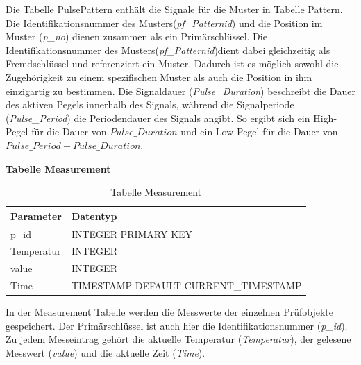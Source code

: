 Die Tabelle PulsePattern enthält die Signale für die Muster in Tabelle Pattern. Die Identifikationsnummer des Musters(\textit{pf\_Patternid}) und die Position im Muster (\textit{p\_no}) dienen zusammen als ein Primärschlüssel. Die Identifikationsnummer des Musters(\textit{pf\_Patternid})dient dabei gleichzeitig als Fremdschlüssel und referenziert ein Muster. Dadurch ist es möglich sowohl die Zugehörigkeit zu einem spezifischen Muster als auch die Position in ihm einzigartig zu bestimmen. Die Signaldauer (\textit{Pulse\_Duration}) beschreibt die Dauer des aktiven Pegels innerhalb des Signals, während die Signalperiode (\textit{Pulse\_Period}) die Periodendauer des Signals angibt. So ergibt sich ein High-Pegel für die Dauer von $Pulse\_Duration$ und ein Low-Pegel für die Dauer von $Pulse\_Period - Pulse\_Duration$.\\

\newpage

\textbf{Tabelle Measurement}\\

\begin{table}[H]
\begin{center}
\begin{tabular}{|l|l|}\hline
Parameter & Datentyp \\ \hline
p\_id & INTEGER PRIMARY KEY \\ 
Temperatur & INTEGER\\
value & INTEGER\\
Time & TIMESTAMP DEFAULT CURRENT\_TIMESTAMP\\ \hline
\end{tabular}
\caption{Tabelle Measurement}
\label{table_TabelleMeasurement}
\end{center}
\end{table}

In der Measurement Tabelle werden die Messwerte der einzelnen Prüfobjekte gespeichert. Der Primärschlüssel ist auch hier die Identifikationsnummer (\textit{p\_id}). Zu jedem Messeintrag gehört die aktuelle Temperatur (\textit{Temperatur}), der gelesene Messwert (\textit{value}) und die aktuelle Zeit (\textit{Time}).




